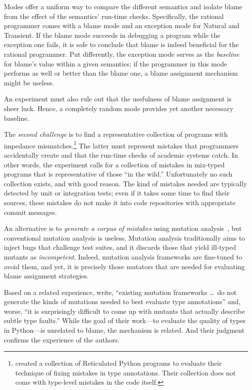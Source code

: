 Modes offer a uniform way to compare the different semantics and isolate blame
from the effect of the semantics' run-time checks. Specifically, the rational
programmer comes with a blame mode and an exception mode for Natural and
Transient. If the blame mode succeeds in debugging a program while the exception
one fails, it is safe to conclude that blame is indeed beneficial for the
rational programmer. Put differently, the exception mode serves as the {\em
baseline\/} for blame's value within a given semantics; if the programmer in
this mode performs as well or better than the blame one, a blame assignment
mechanism might be useless.

An experiment must also rule out that the usefulness of blame assignment is sheer
luck.  Hence, a completely random mode provides yet another necessary baseline.

The {\em second challenge\/} is to find a representative collection of programs
with impedance mismatches.\footnote{\citet{cc-oopsla-20} created a collection of
Reticulated Python programs to evaluate their technique of fixing mistakes in
type annotations. Their collection does not come with type-level mistakes in the
code itself.}  The latter must represent mistakes that programmers accidentally
create and that the run-time checks of academic systems catch. In other words,
the experiment calls for a collection of mistakes in mix-typed programs that is
representative of those ``in the wild.''  Unfortunately no such collection
exists, and with good reason. The kind of mistakes needed are typically detected
by unit or integration tests; even if it takes some time to find their sources,
these mistakes do not make it into code repositories with appropriate commit
messages.

An alternative is to {\em generate a corpus of 
mistakes \/} using mutation analysis~\citep{lipton1971fault, demillo1978hints,
jia2011analysis}, but conventional mutation analysis is useless.  Mutation
analysis traditionally aims to inject bugs that challenge test suites, and it
discards those that yield ill-typed mutants as \emph{incompetent}. Indeed,
mutation analysis frameworks are fine-tuned to avoid them, and yet, it is
precisely those mutators that are needed for evaluating blame assignment strategies.

Based on a related experience, \citet{gw-mutation} write,
``existing mutation frameworks \ldots\ do not generate the kinds of mutations
needed to best evaluate type annotations'' and, worse, ``it is surprisingly
difficult to come up with mutants that actually describe subtle type faults.''
While the goal of their work---to evaluate the quality of types in
Python---is unrelated to blame, the mechanism is related. And their
judgment confirms the experience of the authors. 


